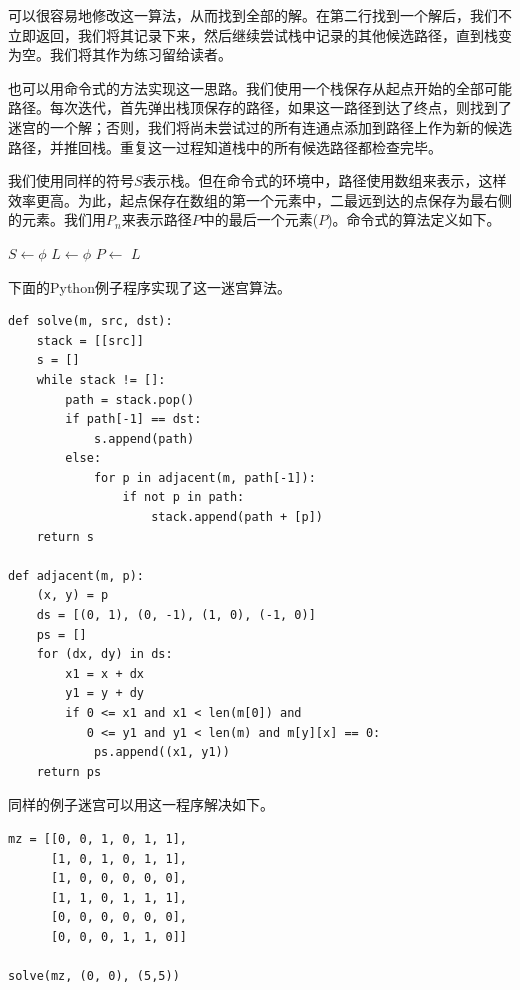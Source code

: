 \documentclass[UTF8]{article}
\begin{document}
可以很容易地修改这一算法，从而找到全部的解。在第二行找到一个解后，我们不立即返回，我们将其记录下来，然后继续尝试栈中记录的其他候选路径，直到栈变为空。我们将其作为练习留给读者。

也可以用命令式的方法实现这一思路。我们使用一个栈保存从起点开始的全部可能路径。每次迭代，首先弹出栈顶保存的路径，如果这一路径到达了终点，则找到了迷宫的一个解；否则，我们将尚未尝试过的所有连通点添加到路径上作为新的候选路径，并推回栈。重复这一过程知道栈中的所有候选路径都检查完毕。

我们使用同样的符号$S$表示栈。但在命令式的环境中，路径使用数组来表示，这样效率更高。为此，起点保存在数组的第一个元素中，二最远到达的点保存为最右侧的元素。我们用$P_n$来表示路径$P$中的最后一个元素($P$)。命令式的算法定义如下。

\begin{algorithmic}[1]
  \State $S \gets \phi$
  \State {}
  \State $L \gets \phi$ 
    \State $P \gets$ 
      \State {}
    \Else
          \State {}
        \EndIf
      \EndFor
    \EndIf
  \EndWhile
  \State \Return $L$
\EndFunction
\end{algorithmic}

下面的Python例子程序实现了这一迷宫算法。

\lstset{language=Python}
\begin{lstlisting}
def solve(m, src, dst):
    stack = [[src]]
    s = []
    while stack != []:
        path = stack.pop()
        if path[-1] == dst:
            s.append(path)
        else:
            for p in adjacent(m, path[-1]):
                if not p in path:
                    stack.append(path + [p])
    return s

def adjacent(m, p):
    (x, y) = p
    ds = [(0, 1), (0, -1), (1, 0), (-1, 0)]
    ps = []
    for (dx, dy) in ds:
        x1 = x + dx
        y1 = y + dy
        if 0 <= x1 and x1 < len(m[0]) and
           0 <= y1 and y1 < len(m) and m[y][x] == 0:
            ps.append((x1, y1))
    return ps
\end{lstlisting}

同样的例子迷宫可以用这一程序解决如下。

\lstset{language=Python}
\begin{lstlisting}
mz = [[0, 0, 1, 0, 1, 1],
      [1, 0, 1, 0, 1, 1],
      [1, 0, 0, 0, 0, 0],
      [1, 1, 0, 1, 1, 1],
      [0, 0, 0, 0, 0, 0],
      [0, 0, 0, 1, 1, 0]]

solve(mz, (0, 0), (5,5))
\end{lstlisting}
\end{document}
